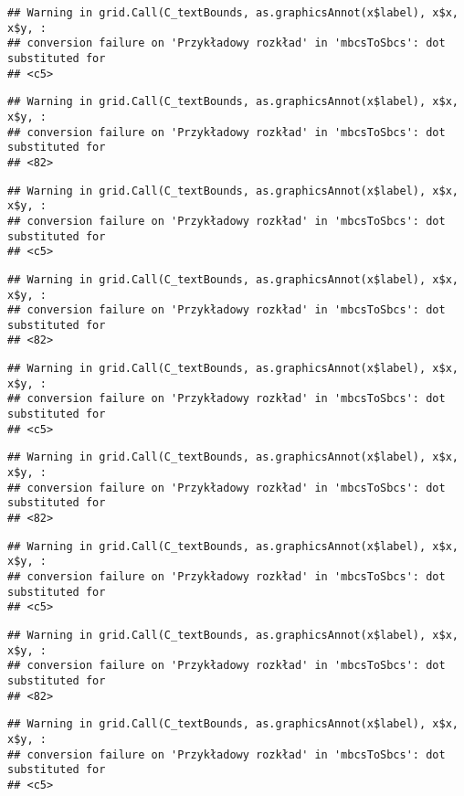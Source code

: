 \documentclass[
]{book}
\begin{document}
\begin{verbatim}
## Warning in grid.Call(C_textBounds, as.graphicsAnnot(x$label), x$x, x$y, :
## conversion failure on 'Przykładowy rozkład' in 'mbcsToSbcs': dot substituted for
## <c5>
\end{verbatim}

\begin{verbatim}
## Warning in grid.Call(C_textBounds, as.graphicsAnnot(x$label), x$x, x$y, :
## conversion failure on 'Przykładowy rozkład' in 'mbcsToSbcs': dot substituted for
## <82>
\end{verbatim}

\begin{verbatim}
## Warning in grid.Call(C_textBounds, as.graphicsAnnot(x$label), x$x, x$y, :
## conversion failure on 'Przykładowy rozkład' in 'mbcsToSbcs': dot substituted for
## <c5>
\end{verbatim}

\begin{verbatim}
## Warning in grid.Call(C_textBounds, as.graphicsAnnot(x$label), x$x, x$y, :
## conversion failure on 'Przykładowy rozkład' in 'mbcsToSbcs': dot substituted for
## <82>
\end{verbatim}

\begin{verbatim}
## Warning in grid.Call(C_textBounds, as.graphicsAnnot(x$label), x$x, x$y, :
## conversion failure on 'Przykładowy rozkład' in 'mbcsToSbcs': dot substituted for
## <c5>
\end{verbatim}

\begin{verbatim}
## Warning in grid.Call(C_textBounds, as.graphicsAnnot(x$label), x$x, x$y, :
## conversion failure on 'Przykładowy rozkład' in 'mbcsToSbcs': dot substituted for
## <82>
\end{verbatim}

\begin{verbatim}
## Warning in grid.Call(C_textBounds, as.graphicsAnnot(x$label), x$x, x$y, :
## conversion failure on 'Przykładowy rozkład' in 'mbcsToSbcs': dot substituted for
## <c5>
\end{verbatim}

\begin{verbatim}
## Warning in grid.Call(C_textBounds, as.graphicsAnnot(x$label), x$x, x$y, :
## conversion failure on 'Przykładowy rozkład' in 'mbcsToSbcs': dot substituted for
## <82>
\end{verbatim}

\begin{verbatim}
## Warning in grid.Call(C_textBounds, as.graphicsAnnot(x$label), x$x, x$y, :
## conversion failure on 'Przykładowy rozkład' in 'mbcsToSbcs': dot substituted for
## <c5>
\end{verbatim}
\end{document}
